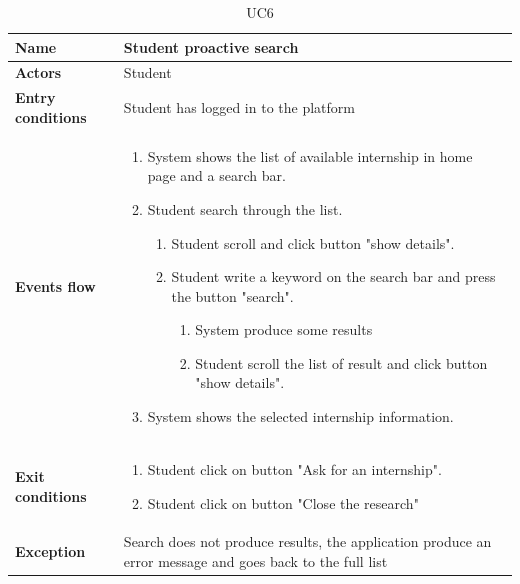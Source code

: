 \begin{table}[H]
\renewcommand\arraystretch{1.25}
    \centering
    \begin{tabular}{|l|p{12 cm}|}
    \hline
    \textbf{Name} & Student proactive search\\
    \hline
    \textbf{Actors} & Student\\
    \hline
    \textbf{Entry conditions} & Student has logged in to the platform\\
    \hline
    \textbf{Events flow} &
    \begin{enumerate}
        \item System shows the list of available internship in home page and a search bar.
        \item Student search through the list.
        \begin{enumerate}
            \item Student scroll and click button "show details".
            \item Student write a keyword on the search bar and press the button "search".
            \begin{enumerate}
                \item System produce some results
                \item Student scroll the list of result and click button "show details".
            \end{enumerate}
        \end{enumerate}
        \item System shows the selected internship information.
    \end{enumerate}\\  
    \hline
    \textbf{Exit conditions} & 
    \begin{enumerate}[label=(\alph*)]
        \item Student click on button "Ask for an internship".
        \item Student click on button "Close the research"
    \end{enumerate}\\
    \hline
    \textbf{Exception} & Search does not produce results, the application produce an error message and goes back to the full list\\
    \hline
    \end{tabular}
    \caption{UC6}
    \label{UC6}
\end{table}


